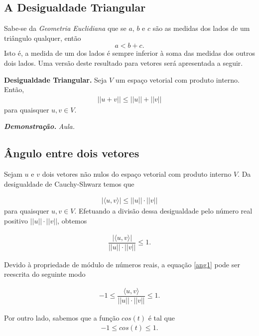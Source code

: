 \subsection{ \textbf{A Desigualdade Triangular}}

Sabe-se da \textit{Geometria Euclidiana} que se $a$, $b$ e $c$ são as medidas dos lados de um triângulo qualquer, então  $$ a < b + c. $$ Isto é, a medida de um dos lados é sempre  inferior à  soma das medidas dos outros dois lados. Uma versão deste resultado para vetores  será apresentada a  seguir.

\vspace{0.7cm}


\textbf{Desigualdade  Triangular.}  Seja $V$ um espaço vetorial com produto interno. Então,
\begin{align}
||u+ v|| \leq ||u|| + ||v||
\end{align}
para quaisquer $u, v \in V$.

\textbf{\textit{Demonstração.}} \textit{Aula.}
\vspace{0.7cm}


\subsection {\textbf{Ângulo entre dois  vetores}}

Sejam  $u$ e $v$  dois vetores não nulos do espaço vetorial com produto interno $V$. Da desigualdade de Cauchy-Shwarz temos que

\begin{align*}
|\langle u, v\rangle| \leq ||u||\cdot ||v|| \end{align*}
para quaisquer $u, v \in V$.  Efetuando a divisão dessa desigualdade pelo número real positivo $ ||u||\cdot ||v|| $, obtemos

\begin{align}
\dfrac{|\langle u, v\rangle|}{ ||u||\cdot ||v|| }\leq 1. \label{ang1}\end{align}

Devido à propriedade de módulo de números reais, a equação \eqref{ang1} pode ser reescrita do seguinte modo

\begin{align}
-1 \leq \dfrac{\langle u, v\rangle}{ ||u||\cdot ||v|| }\leq 1.\end{align}


Por outro lado, sabemos que a função $cos(t)$ é tal que
\begin{align} -1 \leq cos(t)\leq 1. \end{align}


